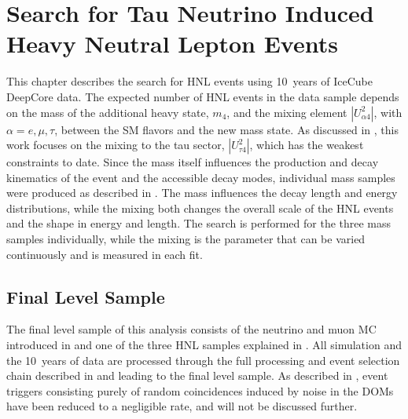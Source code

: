\setchapterpreamble[u]{\margintoc}

\chapter{Search for Tau Neutrino Induced Heavy Neutral Lepton Events}

This chapter describes the search for HNL events using \SI{10}{years} of IceCube DeepCore data. The expected number of HNL events in the data sample depends on the mass of the additional heavy state, $m_4$, and the mixing element $|U_{\alpha4}^2|$, with $\alpha=e,\mu,\tau$, between the SM flavors and the new mass state. As discussed in , this work focuses on the mixing to the tau sector, $|U_{\tau4}^2|$, which has the weakest constraints to date.
Since the mass itself influences the production and decay kinematics of the event and the accessible decay modes, individual mass samples were produced as described in . The mass influences the decay length and energy distributions, while the mixing both changes the overall scale of the HNL events and the shape in energy and length.
The search is performed for the three mass samples individually, while the mixing is the parameter that can be varied continuously and is measured in each fit.


\section{Final Level Sample} 

The final level sample of this analysis consists of the neutrino and muon MC introduced in  and one of the three HNL samples explained in . All simulation and the \SI{10}{years} of data are processed through the full processing and event selection chain described in  and  leading to the final level sample. As described in , event triggers consisting purely of random coincidences induced by noise in the DOMs have been reduced to a negligible rate, and will not be discussed further.

